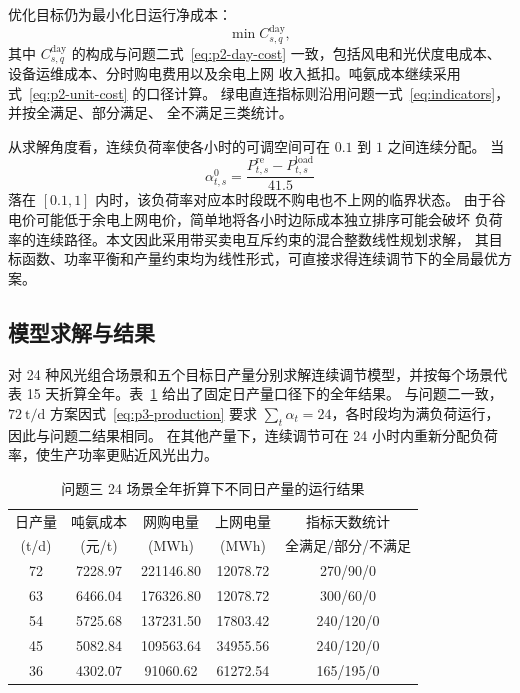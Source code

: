 优化目标仍为最小化日运行净成本：
\begin{equation}
  \min C_{s,q}^{\mathrm{day}},
  \label{eq:p3-objective}
\end{equation}
其中 $C_{s,q}^{\mathrm{day}}$ 的构成与问题二式~\eqref{eq:p2-day-cost}
一致，包括风电和光伏度电成本、设备运维成本、分时购电费用以及余电上网
收入抵扣。吨氨成本继续采用式~\eqref{eq:p2-unit-cost} 的口径计算。
绿电直连指标则沿用问题一式~\eqref{eq:indicators}，并按全满足、部分满足、
全不满足三类统计。

从求解角度看，连续负荷率使各小时的可调空间可在 $0.1$ 到 $1$ 之间连续分配。
当
\begin{equation}
  \alpha_{t,s}^{0}
  =\frac{P_{t,s}^{\mathrm{re}}-P_{t,s}^{\mathrm{load}}}{41.5}
  \label{eq:p3-zero-exchange}
\end{equation}
落在 $[0.1,1]$ 内时，该负荷率对应本时段既不购电也不上网的临界状态。
由于谷电价可能低于余电上网电价，简单地将各小时边际成本独立排序可能会破坏
负荷率的连续路径。本文因此采用带买卖电互斥约束的混合整数线性规划求解，
其目标函数、功率平衡和产量约束均为线性形式，可直接求得连续调节下的全局最优方案。

\subsection{模型求解与结果}

对 24 种风光组合场景和五个目标日产量分别求解连续调节模型，并按每个场景代表
15 天折算全年。表~\ref{tab:p3-annual-result} 给出了固定日产量口径下的全年结果。
与问题二一致，$72~\mathrm{t/d}$ 方案因式~\eqref{eq:p3-production} 要求
$\sum_t\alpha_t=24$，各时段均为满负荷运行，因此与问题二结果相同。
在其他产量下，连续调节可在 24 小时内重新分配负荷率，使生产功率更贴近风光出力。

\begin{table}[H]
  \centering
  \caption{问题三 24 场景全年折算下不同日产量的运行结果}
  \label{tab:p3-annual-result}
  \begin{tabular}{ccccc}
    \toprule
    日产量 & 吨氨成本 & 网购电量 & 上网电量 & 指标天数统计 \\
    (t/d) & (元/t) & (MWh) & (MWh) & 全满足/部分/不满足 \\
    \midrule
    72 & 7228.97 & 221146.80 & 12078.72 & 270/90/0 \\
    63 & 6466.04 & 176326.80 & 12078.72 & 300/60/0 \\
    54 & 5725.68 & 137231.50 & 17803.42 & 240/120/0 \\
    45 & 5082.84 & 109563.64 & 34955.56 & 240/120/0 \\
    36 & 4302.07 & 91060.62 & 61272.54 & 165/195/0 \\
    \bottomrule
  \end{tabular}
\end{table}

